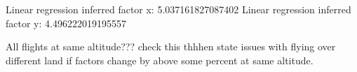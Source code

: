 Linear regression inferred factor x: 5.037161827087402
Linear regression inferred factor y: 4.496222019195557

All flights at same altitude??? check this thhhen state issues with flying over different land if factors change by above some percent at same altitude. 